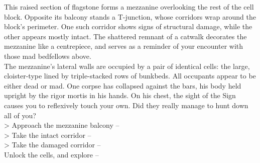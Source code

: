 This raised section of flagstone forms a mezzanine overlooking the rest of the cell block. Opposite its balcony stands a T-junction, whose corridors wrap around the block’s perimeter. One such corridor shows signs of structural damage, while the other appears mostly intact. The shattered remnant of a catwalk decorates the mezzanine like a centrepiece, and serves as a reminder of your encounter with those mad bedfellows above.\\

The mezzanine's lateral walls are occupied by a pair of identical cells: the large, cloister-type lined by triple-stacked rows of bunkbeds. All occupants appear to be either dead or mad. One corpse has collapsed against the bars, his body held upright by the rigor mortis in his hands. On his chest, the sight of the Sign causes you to reflexively touch your own. Did they really manage to hunt down all of you?\\

> Approach the mezzanine balcony -- \\
> Take the intact corridor -- \\
> Take the damaged corridor -- \\
 Unlock the cells, and explore -- 